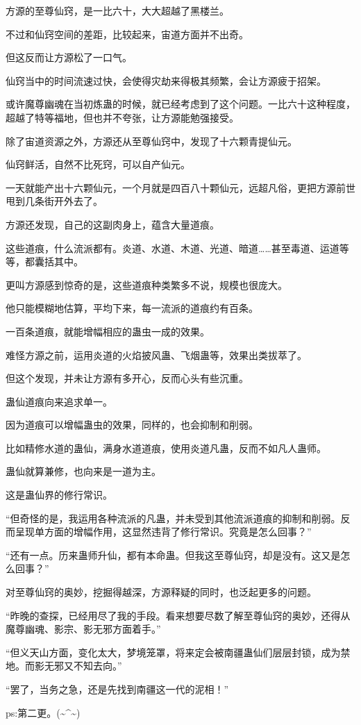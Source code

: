 \begin{this_body}
方源的至尊仙窍，是一比六十，大大超越了黑楼兰。

不过和仙窍空间的差距，比较起来，宙道方面并不出奇。

但这反而让方源松了一口气。

仙窍当中的时间流速过快，会使得灾劫来得极其频繁，会让方源疲于招架。

或许魔尊幽魂在当初炼蛊的时候，就已经考虑到了这个问题。一比六十这种程度，超越了特等福地，但也并不夸张，让方源能勉强接受。

除了宙道资源之外，方源还从至尊仙窍中，发现了十六颗青提仙元。

仙窍鲜活，自然不比死窍，可以自产仙元。

一天就能产出十六颗仙元，一个月就是四百八十颗仙元，远超凡俗，更把方源前世甩到几条街开外去了。

方源还发现，自己的这副肉身上，蕴含大量道痕。

这些道痕，什么流派都有。炎道、水道、木道、光道、暗道……甚至毒道、运道等等，都囊括其中。

更叫方源感到惊奇的是，这些道痕种类繁多不说，规模也很庞大。

他只能模糊地估算，平均下来，每一流派的道痕约有百条。

一百条道痕，就能增幅相应的蛊虫一成的效果。

难怪方源之前，运用炎道的火焰披风蛊、飞烟蛊等，效果出类拔萃了。

但这个发现，并未让方源有多开心，反而心头有些沉重。

蛊仙道痕向来追求单一。

因为道痕可以增幅蛊虫的效果，同样的，也会抑制和削弱。

比如精修水道的蛊仙，满身水道道痕，使用炎道凡蛊，反而不如凡人蛊师。

蛊仙就算兼修，也向来是一道为主。

这是蛊仙界的修行常识。

“但奇怪的是，我运用各种流派的凡蛊，并未受到其他流派道痕的抑制和削弱。反而呈现单方面的增幅作用，这显然违背了修行常识。究竟是怎么回事？”

“还有一点。历来蛊师升仙，都有本命蛊。但我这至尊仙窍，却是没有。这又是怎么回事？”

对至尊仙窍的奥妙，挖掘得越深，方源释疑的同时，也泛起更多的问题。

“昨晚的查探，已经用尽了我的手段。看来想要尽数了解至尊仙窍的奥妙，还得从魔尊幽魂、影宗、影无邪方面着手。”

“但义天山方面，变化太大，梦境笼罩，将来定会被南疆蛊仙们层层封锁，成为禁地。而影无邪又不知去向。”

“罢了，当务之急，还是先找到南疆这一代的泥相！”

ps:第二更。(\~{}\^{}\~{})

\end{this_body}

